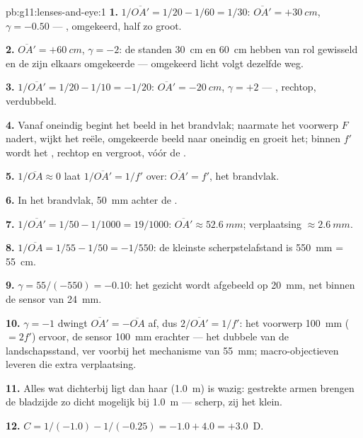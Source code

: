 \begin{solution}{pb:g11:lenses-and-eye:1}
\textbf{1.} $1/\overline{OA'} = 1/20 - 1/60 = 1/30$:
$\overline{OA'} = +\qty{30}{cm}$, $\gamma = -0.50$ --- , omgekeerd,
half zo groot.

\textbf{2.} $\overline{OA'} = +\qty{60}{cm}$, $\gamma = -2$: de standen
\qty{30}{cm} en \qty{60}{cm} hebben van rol gewisseld en de 
zijn elkaars omgekeerde --- omgekeerd licht volgt dezelfde weg.

\textbf{3.} $1/\overline{OA'} = 1/20 - 1/10 = -1/20$:
$\overline{OA'} = \qty{-20}{cm}$, $\gamma = +2$ --- , rechtop,
verdubbeld.

\textbf{4.} Vanaf oneindig begint het beeld in het brandvlak; naarmate
het voorwerp $F$ nadert, wijkt het reële, omgekeerde beeld naar oneindig
en groeit het; binnen $f'$ wordt het , rechtop en vergroot, vóór
de .

\textbf{5.} $1/\overline{OA} \approx 0$ laat
$1/\overline{OA'} = 1/f'$ over: $\overline{OA'} = f'$, het brandvlak.

\textbf{6.} In het brandvlak, \qty{50}{mm} achter de .

\textbf{7.} $1/\overline{OA'} = 1/50 - 1/1000 = 19/1000$:
$\overline{OA'} \approx \qty{52.6}{mm}$; verplaatsing
$\approx \qty{2.6}{mm}$.

\textbf{8.} $1/\overline{OA} = 1/55 - 1/50 = -1/550$: de kleinste
scherpstelafstand is \qty{550}{mm} = \qty{55}{cm}.

\textbf{9.} $\gamma = 55/(-550) = -0.10$: het gezicht wordt afgebeeld op
\qty{20}{mm}, net binnen de sensor van \qty{24}{mm}.

\textbf{10.} $\gamma = -1$ dwingt $\overline{OA'} = -\overline{OA}$ af,
dus $2/\overline{OA'} = 1/f'$: het voorwerp \qty{100}{mm} ($= 2f'$)
ervoor, de sensor \qty{100}{mm} erachter --- het dubbele van de
landschapsstand, ver voorbij het mechanisme van \qty{55}{mm};
macro-objectieven leveren die extra verplaatsing.

\textbf{11.} Alles wat dichterbij ligt dan haar  (\qty{1.0}{m})
is wazig: gestrekte armen brengen de bladzijde zo dicht mogelijk bij
\qty{1.0}{m} --- scherp, zij het klein.

\textbf{12.} $C = 1/(-1.0) - 1/(-0.25) = -1.0 + 4.0 = +3.0$~D.


\end{solution}
